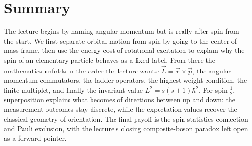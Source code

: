 \section{Summary}

The lecture begins by naming angular momentum but is really after spin from the start. We first separate orbital motion from spin by going to the center-of-mass frame, then use the energy cost of rotational excitation to explain why the spin of an elementary particle behaves as a fixed label. From there the mathematics unfolds in the order the lecture wants: \(\vec L=\vec r\times\vec p\), the angular-momentum commutators, the ladder operators, the highest-weight condition, the finite multiplet, and finally the invariant value \(L^2=s(s+1)\hbar^2\). For spin \(\tfrac12\), superposition explains what becomes of directions between up and down: the measurement outcomes stay discrete, while the expectation values recover the classical geometry of orientation. The final payoff is the spin-statistics connection and Pauli exclusion, with the lecture's closing composite-boson paradox left open as a forward pointer.